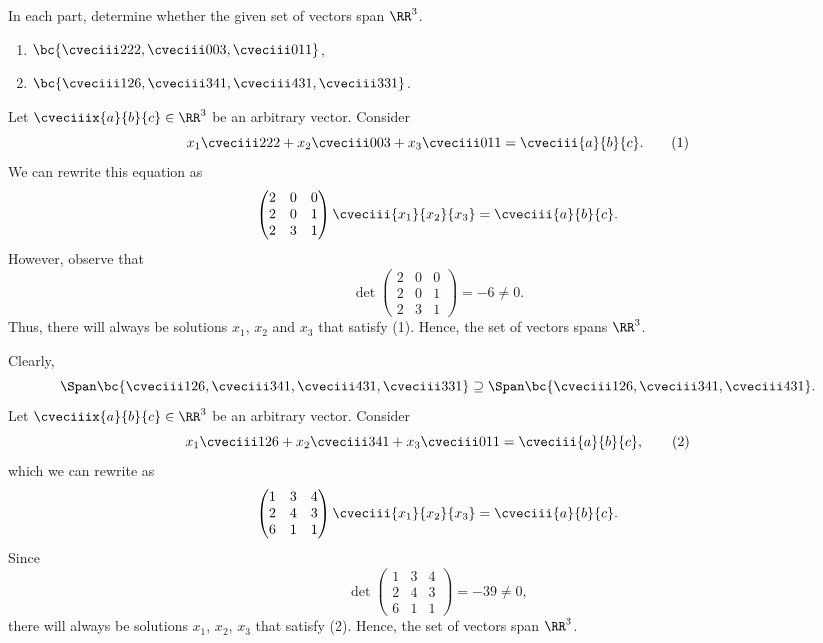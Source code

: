 \begin{problem}
    In each part, determine whether the given set of vectors span $\RR^3$.

    \begin{enumerate}
        \item $\bc{\cveciii222, \cveciii003, \cveciii011}$,
        \item $\bc{\cveciii126, \cveciii341, \cveciii431, \cveciii331}$.
    \end{enumerate}
\end{problem}
\begin{solution}
    \begin{ppart}
        Let $\cveciiix{a}{b}{c} \in \RR^3$ be an arbitrary vector. Consider \[x_1 \cveciii222 + x_2 \cveciii003 + x_3 \cveciii011 = \cveciii{a}{b}{c}. \tag{1}\] We can rewrite this equation as \[\begin{pmatrix}2 & 0 & 0 \\ 2 & 0 & 1 \\ 2 & 3 & 1\end{pmatrix} \cveciii{x_1}{x_2}{x_3} = \cveciii{a}{b}{c}.\] However, observe that \[\det \begin{pmatrix}2 & 0 & 0 \\ 2 & 0 & 1 \\ 2 & 3 & 1\end{pmatrix} = -6 \neq 0.\] Thus, there will always be solutions $x_1$, $x_2$ and $x_3$ that satisfy (1). Hence, the set of vectors spans $\RR^3$.
    \end{ppart}
    \begin{ppart}
        Clearly, \[\Span \bc{\cveciii126, \cveciii341, \cveciii431, \cveciii331} \supseteq \Span \bc{\cveciii126, \cveciii341, \cveciii431}.\] Let $\cveciiix{a}{b}{c} \in \RR^3$ be an arbitrary vector. Consider \[x_1 \cveciii126 + x_2 \cveciii341 + x_3 \cveciii011 = \cveciii{a}{b}{c}, \tag{2}\] which we can rewrite as \[\begin{pmatrix}1 & 3 & 4 \\ 2 & 4 & 3 \\ 6 & 1 & 1\end{pmatrix} \cveciii{x_1}{x_2}{x_3} = \cveciii{a}{b}{c}.\] Since \[\det \begin{pmatrix}1 & 3 & 4 \\ 2 & 4 & 3 \\ 6 & 1 & 1\end{pmatrix} = -39 \neq 0,\] there will always be solutions $x_1$, $x_2$, $x_3$ that satisfy (2). Hence, the set of vectors span $\RR^3$.
    \end{ppart}
\end{solution}


